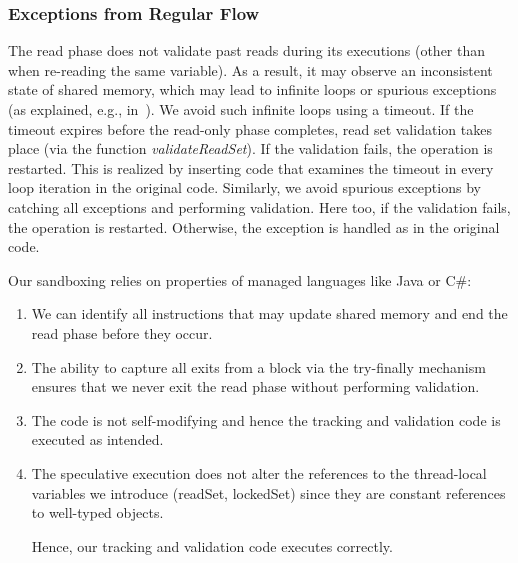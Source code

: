 \subsubsection{Exceptions from Regular Flow}
\label{sssec:alg-abnormal}


The read phase does not validate past reads during its executions (other than when re-reading the same variable). 
As a result, it may observe an inconsistent state of shared memory, which may lead to infinite loops or spurious exceptions (as explained, e.g., in~\cite{HLR:SLCA2010}).
%
We avoid such infinite loops using a timeout.
If the timeout expires before the read-only phase completes, read set
validation takes place (via the function \emph{validateReadSet}). If the validation fails, the operation is restarted.
This is realized by inserting code that examines the timeout in every loop iteration in the original code.
%
Similarly, we avoid spurious exceptions by catching all exceptions and
performing validation. Here too, if the validation fails, the operation is restarted. Otherwise, the exception is handled as in
the original code.

Our sandboxing relies on properties of managed languages like Java or C\#: 
\begin{enumerate}
\item We can identify all instructions that may update shared memory and end the read phase before they occur. 

\item The ability to capture all exits from a block via the try-finally mechanism ensures that we never exit the read phase without performing validation. 

\item The code is not self-modifying and hence the tracking and validation code is executed as intended. 

\item The speculative execution does not alter the references to the thread-local variables we introduce (readSet, lockedSet) since they are constant references to well-typed objects. 

Hence, our tracking and validation code executes correctly. 
\end{enumerate}

